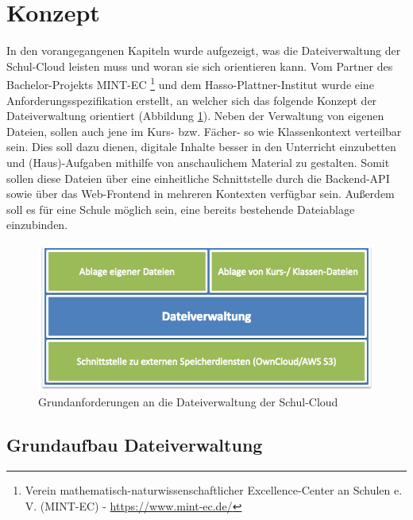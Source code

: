 \section{Konzept}
\label{sec:concept}

In den vorangegangenen Kapiteln wurde aufgezeigt, was die Dateiverwaltung der Schul-Cloud leisten muss und woran sie sich orientieren kann. Vom Partner des Bachelor-Projekts MINT-EC \footnote{Verein mathematisch-naturwissenschaftlicher Excellence-Center an Schulen e. V. (MINT-EC) - \url{https://www.mint-ec.de/}}  und dem Hasso-Plattner-Institut wurde eine Anforderungsspezifikation erstellt, an welcher sich das folgende Konzept der Dateiverwaltung orientiert (Abbildung \ref{fig:anforderungen}). Neben der Verwaltung von eigenen Dateien, sollen auch  jene im Kurs- bzw. Fächer- so wie Klassenkontext verteilbar sein. Dies soll dazu dienen, digitale Inhalte besser in den Unterricht einzubetten und (Haus)-Aufgaben mithilfe von anschaulichem Material zu gestalten. Somit sollen diese Dateien über eine einheitliche Schnittstelle durch die Backend-API sowie über das Web-Frontend in mehreren Kontexten verfügbar sein. Außerdem soll es für eine Schule möglich sein, eine bereits bestehende Dateiablage einzubinden. 

\begin{figure}[H]
	\centering
	\includegraphics[width=0.8\linewidth]{images/AnforderungenDateiverwaltung}
	\caption[Caption for concept]{Grundanforderungen an die Dateiverwaltung der Schul-Cloud\footnotemark}
	\label{fig:anforderungen}
\end{figure}


\subsection{Grundaufbau Dateiverwaltung}
\label{sec:basicaufbau}

